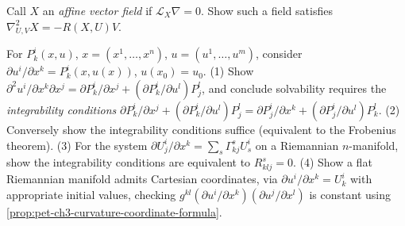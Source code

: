 \begin{remark}
  \label{rem:pet-ch3-ex-19}
  \leanok
  Call $X$ an \emph{affine vector field} if $\mathcal L_X\nabla=0$. Show such a
  field satisfies $\nabla^2_{U,V}X=-R(X,U)V$.
\end{remark}

\begin{remark}
  \label{rem:pet-ch3-ex-20}
  \leanok
  For $P^i_k(x,u)$, $x=(x^1,\dots,x^n)$, $u=(u^1,\dots,u^m)$, consider
  $\partial u^i/\partial x^k=P^i_k(x,u(x))$, $u(x_0)=u_0$. (1) Show
  $\partial^2u^i/\partial x^k\partial x^j=\partial P^i_k/\partial
  x^j+(\partial P^i_k/\partial u^l)P^l_j$, and conclude solvability requires the
  \emph{integrability conditions}
  $\partial P^i_k/\partial x^j+(\partial P^i_k/\partial u^l)P^l_j=\partial
  P^i_j/\partial x^k+(\partial P^i_j/\partial u^l)P^l_k$. (2) Conversely show
  the integrability conditions suffice (equivalent to the Frobenius theorem). (3)
  For the system $\partial U^i_j/\partial x^k=\sum_s\Gamma^s_{kj}U^i_s$ on a
  Riemannian $n$-manifold, show the integrability conditions are equivalent to
  $R^s_{klj}=0$. (4) Show a flat Riemannian manifold admits Cartesian
  coordinates, via $\partial u^i/\partial x^k=U^i_k$ with appropriate initial
  values, checking $g^{kl}(\partial u^i/\partial x^k)(\partial u^j/\partial x^l)$
  is constant using \cref{prop:pet-ch3-curvature-coordinate-formula}.
\end{remark}

